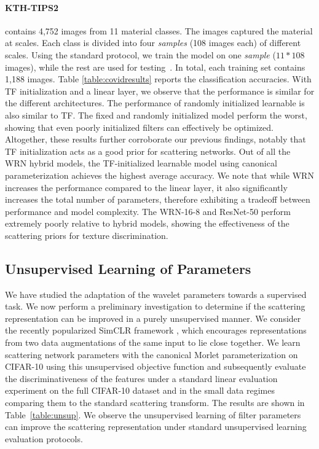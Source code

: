 \documentclass[10pt,twocolumn,letterpaper]{article}
\begin{document}
\paragraph{KTH-TIPS2} \hspace{-8pt} \hspace{-8pt} contains 4,752 images from 11 material classes. The images captured the material at scales.  Each class is divided into four \emph{samples} (108 images each) of different scales.  Using the standard protocol, we train the model on one \emph{sample} ($11*108$ images), while the rest are used for testing~\cite{song2017locally}. In total, each training set contains 1,188 images. Table \ref{table:covidresults} reports the classification accuracies. With TF initialization and a linear layer, we observe that the performance is similar for the different architectures. The performance of randomly initialized learnable is also similar to TF. The fixed and randomly initialized model perform the worst, showing that even poorly initialized filters can effectively be optimized. Altogether, these results further corroborate our previous findings, notably that TF initialization acts as a good prior for scattering networks. Out of all the WRN hybrid models, the TF-initialized learnable model using canonical parameterization achieves the highest average accuracy. We note that while WRN increases the performance compared to the linear layer, it also significantly increases the total number of parameters, therefore exhibiting a tradeoff between performance and model complexity. The WRN-16-8 and ResNet-50 perform extremely poorly relative to hybrid models, showing the effectiveness of the scattering priors for texture discrimination.  


\subsection{Unsupervised Learning of Parameters}
\label{sec:unsup}
We have studied the adaptation of the wavelet parameters towards a supervised task. We now perform a preliminary investigation to determine if the scattering representation can be improved in a purely unsupervised manner. We consider the recently popularized SimCLR framework \cite{chen2020simple}, which encourages representations from two data augmentations of the same input to lie close together. We learn scattering network parameters with the canonical Morlet parameterization on CIFAR-10 using this unsupervised objective function and subsequently evaluate the discriminativeness of the features under a standard linear evaluation experiment on the full CIFAR-10 dataset and in the small data regimes comparing them to the standard scattering transform. The results are shown in Table~\ref{table:unsup}. We observe the unsupervised learning of filter parameters can improve the scattering representation under standard unsupervised learning evaluation protocols. 
\end{document}
